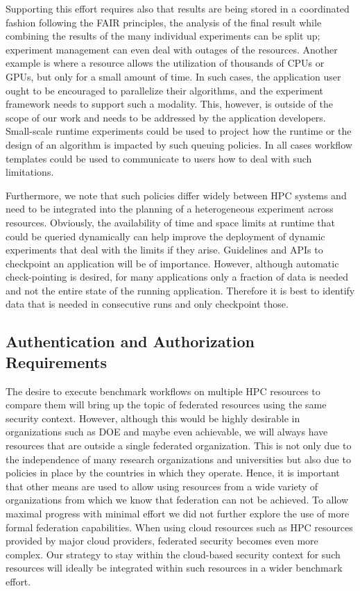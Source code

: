 \documentclass[sigconf]{acmart}
\begin{document}
Supporting this effort requires also that results are being stored in a coordinated fashion following the FAIR principles, the analysis of the final result while combining the results of the many individual experiments can be split up; experiment management can even deal with outages of the resources. Another example is where a resource allows the utilization of thousands of CPUs or GPUs, but only for a small amount of time. In such cases, the application user ought to be encouraged to parallelize their algorithms, and the experiment framework needs to support such a modality. This, however, is outside of the scope of our work and needs to be addressed by the application developers. Small-scale runtime experiments could be used to project how the runtime or the design of an algorithm is impacted by such queuing policies. In all cases workflow templates could be used to communicate to users how to deal with such limitations.

Furthermore, we note that such policies differ widely between HPC systems and need to be integrated into the planning of a heterogeneous experiment across resources. Obviously, the availability of time and space limits at runtime that could be queried dynamically can help improve the deployment of dynamic experiments that deal with the limits if they arise. Guidelines and APIs to checkpoint an application will be of importance. However, although automatic check-pointing is desired, for many applications only a fraction of data is needed and not the entire state of the running application. Therefore it is best to identify data that is needed in consecutive runs and only checkpoint those.


\subsection{Authentication and Authorization Requirements}

The desire to execute benchmark workflows on multiple HPC resources to compare them will bring up the topic of federated resources using the same security context. However, although this would be highly desirable in organizations such as DOE \citep{antypas2021} and maybe even achievable, we will always have resources that are outside a single federated organization. This is not only due to the independence of many research organizations and universities but also due to policies in place by the countries in which they operate. Hence, it is important that other means are used to allow using resources from a wide variety of organizations from which we know that federation can not be achieved. To allow maximal progress with minimal effort we did not further explore the use of more formal federation capabilities. When using cloud resources such as HPC resources provided by major cloud providers, federated security becomes even more complex. Our strategy to stay within the cloud-based security context for such resources will ideally be integrated within such resources in a wider benchmark effort.
\end{document}
